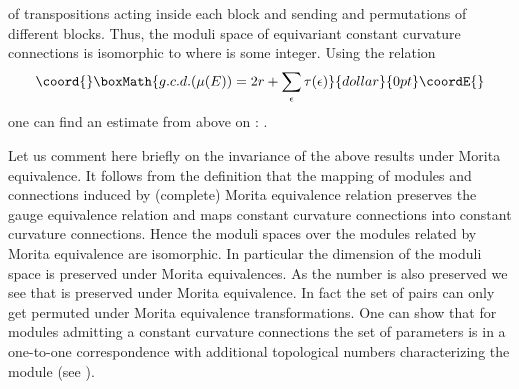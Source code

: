\documentclass[a4paper,a4paper]{article}
\begin{document}
{of transpositions  acting inside each  \coordHE{} block and sending \coordHE{} 
and permutations of different \coordHE{} blocks.  Thus, the moduli space of equivariant constant curvature  connections 
 is isomorphic to  \coordHE{} where \coordHE{} is some integer. Using the relation 
$$\coord{}\boxMath{
 g.c.d. (\mu(E)) = 2r + \sum_{\epsilon} \tau(\epsilon)
}{dollar}{0pt}\coordE{}$$
one can find an estimate from above on \coordHE{}: \coordHE{}.   


Let us comment here briefly on the invariance of the above results under  Morita equivalence. It follows from the definition  that the mapping 
of modules and connections induced by (complete) Morita equivalence relation preserves the gauge equivalence relation and 
maps constant curvature connections into constant curvature connections. Hence the moduli spaces over the modules related by Morita equivalence are 
isomorphic.
In particular the  dimension \coordHE{} of the moduli space  is preserved under Morita equivalences. As the number \coordHE{} 
is also preserved we see that 
\coordHE{}
is preserved under Morita equivalence. In fact the set of pairs  \myHighlight{$(\tau(\epsilon), \eta_{\epsilon})$}\coordHE{} can only get 
permuted under  Morita equivalence transformations. One can show that for modules admitting a constant curvature connections 
the set of parameters  \myHighlight{$\{(\tau(\epsilon), \eta_{\epsilon})\}$}\coordHE{} is in a one-to-one correspondence with additional 
topological numbers characterizing the module (see \cite{z2}). 



}
\end{document}
